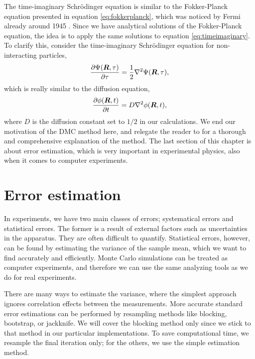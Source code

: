 The time-imaginary Schrödinger equation is similar to the Fokker-Planck equation presented in equation \eqref{eq:fokkerplanck}, which was noticed by Fermi already around 1945 \supercite{metropolis_monte_1949,ceperley_quantum_1986}. Since we have analytical solutions of the Fokker-Planck equation, the idea is to apply the same solutions to equation \eqref{eq:timeimaginary}. To clarify this, consider the time-imaginary Schrödinger equation for non-interacting particles,
\begin{equation}
\frac{\partial\Psi(\boldsymbol{{R}},\tau)}{\partial\tau}=\frac{1}{2}\nabla^2\Psi(\boldsymbol{{R}},\tau),
\end{equation}
which is really similar to the diffusion equation,
\begin{equation}
\frac{\partial\phi(\boldsymbol{{R}},t)}{\partial t}=D\nabla^2\phi(\boldsymbol{{R}},t),
\end{equation}
where $D$ is the diffusion constant set to $1/2$ in our calculations. We end our motivation of the DMC method here, and relegate the reader to \citet{kosztin_introduction_1996} for a thorough and comprehensive explanation of the method. The last section of this chapter is about error estimation, which is very important in experimental physics, also when it comes to computer experiments. 

\section{Error estimation} \label{sec:variance}
In experiments, we have two main classes of errors; systematical errors and statistical errors. The former is a result of external factors such as uncertainties in the apparatus. They are often difficult to quantify. Statistical errors, however, can be found by estimating the variance of the sample mean, which we want to find accurately and efficiently. Monte Carlo simulations can be treated as computer experiments, and therefore we can use the same analyzing tools as we do for real experiments.

There are many ways to estimate the variance, where the simplest approach ignores correlation effects between the measurements. More accurate standard error estimations can be performed by resampling methods like blocking\supercite{flyvbjerg_error_1989}, bootstrap\supercite{efron_bootstrap_1979}, or jackknife\supercite{quenouille_problems_1949}. We will cover the blocking method only since we stick to that method in our particular implementations. To save computational time, we resample the final iteration only; for the others, we use the simple estimation method.

